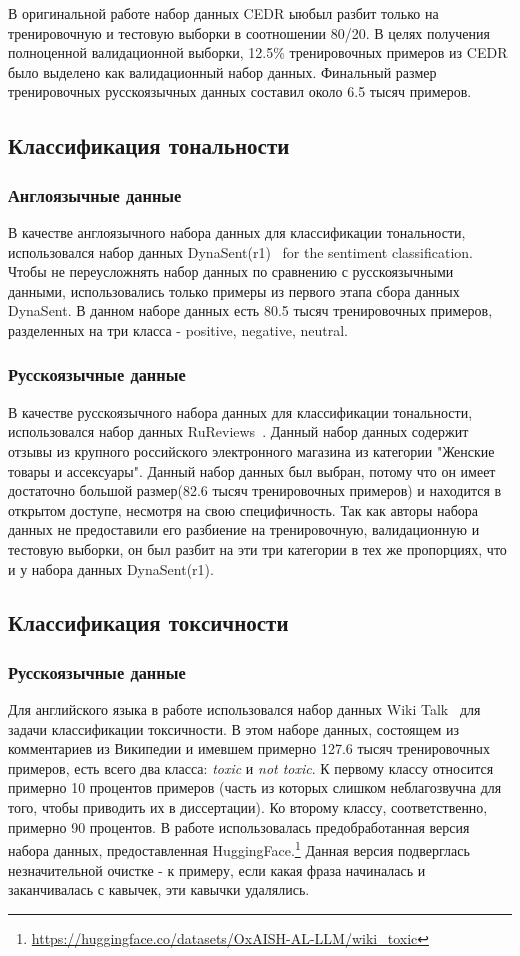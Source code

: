 В оригинальной работе набор данных CEDR ыюбыл разбит только на тренировочную и тестовую выборки в соотношении 80/20. В целях получения полноценной валидационной выборки, 12.5\% тренировочных примеров из CEDR было выделено как валидационный набор данных. Финальный размер тренировочных русскоязычных данных составил около 6.5 тысяч примеров.


\subsection{Классификация тональности}

\subsubsection{Англоязычные данные} 
В качестве англоязычного набора данных для классификации тональности, использовался набор данных {DynaSent}(r1)~\cite{sentiment} for the sentiment classification. Чтобы не переусложнять набор данных по сравнению с русскоязычными данными, использовались только примеры из первого этапа сбора данных DynaSent. В данном наборе данных есть 80.5 тысяч тренировочных примеров, разделенных на три класса - positive, negative, neutral.

\subsubsection{Русскоязычные данные} 
В качестве русскоязычного набора данных для классификации тональности, использовался набор данных {RuReviews}~\cite{ru_sentiment}. Данный набор данных содержит отзывы из крупного российского электронного магазина из категории "Женские товары и ассексуары". Данный набор данных был выбран, потому что он имеет достаточно большой размер(82.6 тысяч тренировочных примеров) и находится в открытом доступе, несмотря на свою специфичность. Так как авторы набора данных не предоставили его разбиение на тренировочную, валидационную и тестовую выборки, он был разбит на эти три категории в тех же пропорциях, что и у набора данных
 {DynaSent}(r1).

\subsection{Классификация токсичности}
\subsubsection{Русскоязычные данные}
Для английского языка в работе использовался набор данных {Wiki Talk}~\cite{toxic} для задачи классификации токсичности. В этом наборе данных, состоящем из комментариев из Википедии и имевшем примерно 127.6 тысяч тренировочных примеров, есть всего два класса: \textit{toxic} и \textit{not toxic}. К первому классу относится примерно 10 процентов примеров (часть из которых слишком неблагозвучна для того, чтобы приводить их в диссертации). Ко второму классу, соответственно, примерно 90 процентов.  В работе использовалась предобработанная версия набора данных, предоставленная HuggingFace.\footnote{\url{https://huggingface.co/datasets/OxAISH-AL-LLM/wiki_toxic}} Данная версия подверглась незначительной очистке - к примеру, если какая фраза начиналась и заканчивалась с кавычек, эти кавычки удалялись.
